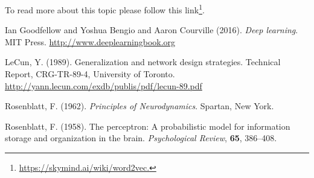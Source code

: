 \documentclass[12pt]{article}
\theoremstyle{plain}
\begin{document}
To read more about this topic please follow this link\footnote{\url{https://skymind.ai/wiki/word2vec.}}.

\vfill

\begin{thebibliography}{Nature}
%

\hypertarget{Deeplea_Goodfellow}{}
Ian Goodfellow and Yoshua Bengio and Aaron Courville (2016). \textit{Deep learning}. MIT Press. \url{http://www.deeplearningbook.org}

\hypertarget{Deeplea_LeCun_1}{}
LeCun, Y. (1989). Generalization and network design strategies. Technical Report, CRG-TR-89-4, University of Toronto. \url{http://yann.lecun.com/exdb/publis/pdf/lecun-89.pdf}

\hypertarget{Deeplea_Rosenblatt_2}{}
Rosenblatt, F. (1962). \textit{Principles of Neurodynamics}. Spartan, New York.

\hypertarget{Deeplea_Rosenblatt_1}{}
Rosenblatt, F. (1958). The perceptron: A probabilistic model for information storage and organization in the brain. \textit{Psychological Review}, \textbf{65}, 386–408.
\end{thebibliography}
\end{document}
